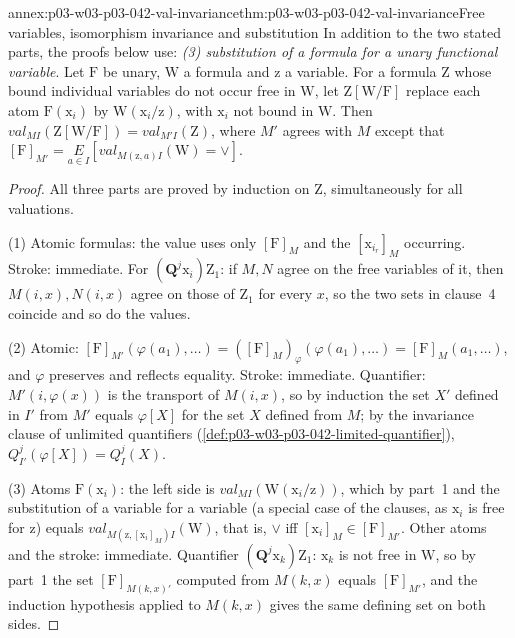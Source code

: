 \begin{annexitem}{annex:p03-w03-p03-042-val-invariance}{thm:p03-w03-p03-042-val-invariance}{Free variables, isomorphism invariance and substitution}
In addition to the two stated parts, the proofs below use:
\emph{(3) substitution of a formula for a unary functional variable}.  Let
\(\mathrm F\) be unary, \(\mathrm W\) a formula and \(\mathrm z\) a
variable.  For a formula \(\mathrm Z\) whose bound individual variables do
not occur free in \(\mathrm W\), let \(\mathrm Z[\mathrm W/\mathrm F]\)
replace each atom \(\mathrm F(\mathrm x_i)\) by \(\mathrm W(\mathrm x_i/
\mathrm z)\), with \(\mathrm x_i\) not bound in \(\mathrm W\).  Then
\(\mathit{val}_{MI}(\mathrm Z[\mathrm W/\mathrm F])=\mathit{val}_{M'I}
(\mathrm Z)\), where \(M'\) agrees with \(M\) except that
\([\mathrm F]_{M'}=\underset{a\in I}{E}[\mathit{val}_{M(\mathrm z,a)I}
(\mathrm W)=\vee]\).
\begin{proof}
All three parts are proved by induction on \(\mathrm Z\), simultaneously
for all valuations.

(1) Atomic formulas: the value uses only \([\mathrm F]_M\) and the
\([\mathrm x_{i_r}]_M\) occurring.  Stroke: immediate.  For
\((\mathbf Q^j\mathrm x_i)\mathrm Z_1\): if \(M,N\) agree on the free
variables of it, then \(M(i,x),N(i,x)\) agree on those of \(\mathrm Z_1\)
for every \(x\), so the two sets in clause~4 coincide and so do the values.

(2) Atomic: \([\mathrm F]_{M'}(\varphi(a_1),\ldots)=([\mathrm F]_M)_\varphi
(\varphi(a_1),\ldots)=[\mathrm F]_M(a_1,\ldots)\), and \(\varphi\) preserves
and reflects equality.  Stroke: immediate.  Quantifier: \(M'(i,\varphi(x))\)
is the transport of \(M(i,x)\), so by induction the set \(X'\) defined in
\(I'\) from \(M'\) equals \(\varphi[X]\) for the set \(X\) defined from
\(M\); by the invariance clause of unlimited quantifiers
(\cref{def:p03-w03-p03-042-limited-quantifier}),
\(Q^j_{I'}(\varphi[X])=Q^j_I(X)\).

(3) Atoms \(\mathrm F(\mathrm x_i)\): the left side is
\(\mathit{val}_{MI}(\mathrm W(\mathrm x_i/\mathrm z))\), which by part~1 and
the substitution of a variable for a variable (a special case of the
clauses, as \(\mathrm x_i\) is free for \(\mathrm z\)) equals
\(\mathit{val}_{M(\mathrm z,[\mathrm x_i]_M)I}(\mathrm W)\), that is,
\(\vee\) iff \([\mathrm x_i]_M\in[\mathrm F]_{M'}\).  Other atoms and the
stroke: immediate.  Quantifier \((\mathbf Q^j\mathrm x_k)\mathrm Z_1\):
\(\mathrm x_k\) is not free in \(\mathrm W\), so by part~1 the set
\([\mathrm F]_{M(k,x)'}\) computed from \(M(k,x)\) equals
\([\mathrm F]_{M'}\), and the induction hypothesis applied to
\(M(k,x)\) gives the same defining set on both sides.
\end{proof}
\end{annexitem}

